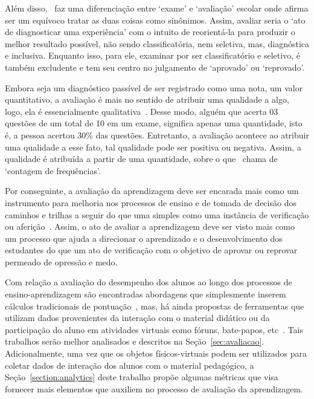 Além disso,~\cite{luckesi:2002} faz uma diferenciação entre `exame' e `avaliação' escolar onde afirma ser um equívoco tratar as duas coisas como sinônimos. Assim, avaliar seria o `ato de diagnosticar uma experiência' com o intuito de reorientá-la para produzir o melhor resultado possível, não sendo classificatória, nem seletiva, mas, diagnóstica e inclusiva. Enquanto isso, para ele, examinar por ser classificatório e seletivo, é também excludente e tem seu centro no julgamento de `aprovado' ou `reprovado'.

Embora seja um diagnóstico passível de ser registrado como uma nota, um valor quantitativo, a avaliação é mais no sentido de atribuir uma qualidade a algo, logo, ela é essencialmente qualitativa~\citep{luckesi:2002}. Desse modo, alguém que acerta 03 questões de um total de 10 em um exame, significa apenas uma quantidade, isto é, a pessoa acertou 30\% das questões. Entretanto, a avaliação acontece ao atribuir uma qualidade a esse fato, tal qualidade pode ser positiva ou negativa. Assim, a qualidade é atribuída a partir de uma quantidade, sobre o que~\cite{luckesi:2002} chama de `contagem de frequências'.

Por conseguinte, a avaliação da aprendizagem deve ser encarada mais como um instrumento para melhoria nos processos de ensino e de tomada de decisão dos caminhos e trilhas a seguir do que uma simples como uma instância de verificação ou aferição~\cite{luckesi:2014}. Assim, o ato de avaliar a aprendizagem deve ser visto mais como um processo que ajuda a direcionar o aprendizado e o desenvolvimento dos estudantes do que um ato de verificação com o objetivo de aprovar ou reprovar permeado de opressão e medo.

Com relação a avaliação do desempenho dos alunos ao longo dos processos de ensino-aprendizagem são encontradas abordagens que simplesmente inserem cálculos tradicionais de pontuação~\citep{Orlandi:2012}, mas, há ainda propostas de ferramentas que utilizam dados provenientes da interação com o material didático ou da participação do aluno em atividades virtuais como fóruns, bate-papos, etc~\citep{Lucena:2015, Nunes:2016, Malvezzi:2010}. Tais trabalhos serão melhor analisados e descritos na Seção~\ref{sec:avaliacao}. Adicionalmente, uma vez que os objetos físicos-virtuais podem ser utilizados para coletar dados de interação dos alunos com o material pedagógico, a Seção~\ref{section:analytics} deste trabalho propõe algumas métricas que visa fornecer mais elementos que auxiliem no processo de avaliação da aprendizagem.


